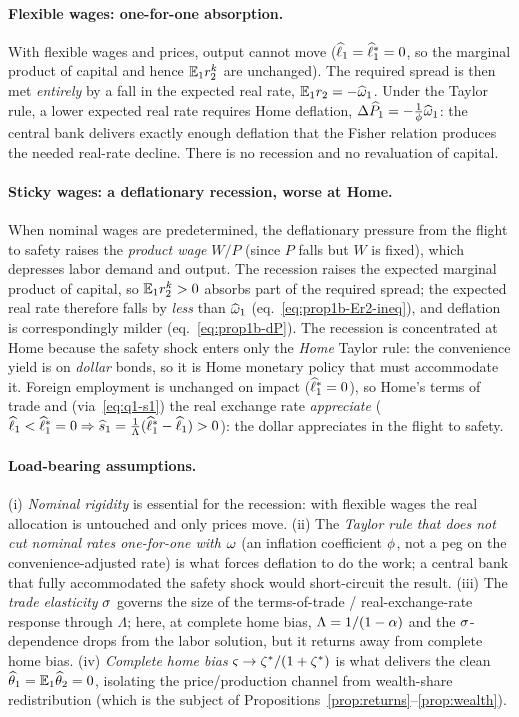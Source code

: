 \paragraph{Flexible wages: one-for-one absorption.} With flexible wages and
prices, output cannot move ($\widehat{\ell}_1=\widehat{\ell}^{*}_1=0$, so the marginal
product of capital and hence $\mathbb{E}_1r^{k}_2$ are unchanged). The required spread is
then met \emph{entirely} by a fall in the expected real rate,
$\mathbb{E}_1r_2=-\widehat{\omega}_1$. Under the Taylor rule, a lower expected real rate
requires Home deflation, $\Delta\widehat{P}_1=-\frac{1}{\phi}\widehat{\omega}_1$: the central
bank delivers exactly enough deflation that the Fisher relation produces the
needed real-rate decline. There is no recession and no revaluation of capital.

\paragraph{Sticky wages: a deflationary recession, worse at Home.} When nominal
wages are predetermined, the deflationary pressure from the flight to safety
raises the \emph{product wage} $W/P$ (since $P$ falls but $W$ is fixed), which
depresses labor demand and output. The recession raises the expected marginal
product of capital, so $\mathbb{E}_1r^{k}_2>0$ absorbs part of the required spread; the
expected real rate therefore falls by \emph{less} than $\widehat{\omega}_1$
(eq.~\eqref{eq:prop1b-Er2-ineq}), and deflation is correspondingly milder
(eq.~\eqref{eq:prop1b-dP}). The recession is concentrated at Home because the
safety shock enters only the \emph{Home} Taylor rule: the convenience yield is on
\emph{dollar} bonds, so it is Home monetary policy that must accommodate it.
Foreign employment is unchanged on impact ($\widehat{\ell}^{*}_1=0$), so Home's
terms of trade and (via~\eqref{eq:q1-s1}) the real exchange rate \emph{appreciate}
($\widehat{\ell}_1<\widehat{\ell}^{*}_1=0\Rightarrow\widehat{s}_1=\frac{1}{\Lambda}(\widehat{\ell}^{*}_1-\widehat{\ell}_1)>0$):
the dollar appreciates in the flight to safety.

\paragraph{Load-bearing assumptions.} (i) \emph{Nominal rigidity} is essential
for the recession: with flexible wages the real allocation is untouched and only
prices move. (ii) The \emph{Taylor rule that does not cut nominal rates
one-for-one with $\omega$} (an inflation coefficient $\phi$, not a peg on the
convenience-adjusted rate) is what forces deflation to do the work; a central
bank that fully accommodated the safety shock would short-circuit the result.
(iii) The \emph{trade elasticity} $\sigma$ governs the size of the terms-of-trade /
real-exchange-rate response through $\Lambda$; here, at complete home bias,
$\Lambda=1/(1-\alpha)$ and the $\sigma$-dependence drops from the labor solution,
but it returns away from complete home bias. (iv) \emph{Complete home bias}
$\varsigma\to\zeta^{*}/(1+\zeta^{*})$ is what delivers the clean $\widehat{\theta}_1=\mathbb{E}_1\widehat{\theta}_2=0$,
isolating the price/production channel from wealth-share redistribution (which is
the subject of Propositions~\ref{prop:returns}--\ref{prop:wealth}).

